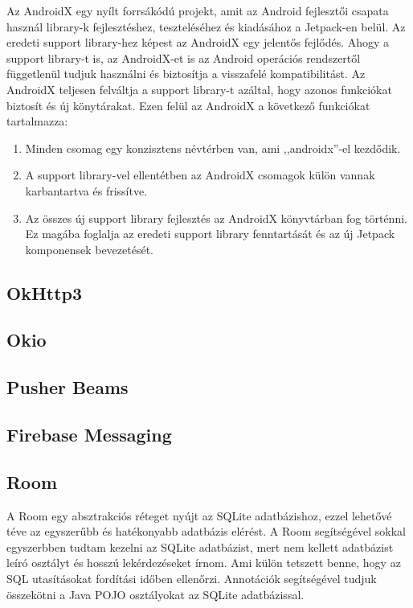 \documentclass{thesis-ekf}
\theoremstyle{definition}
\theoremstyle{remark}
\begin{document}
Az AndroidX egy nyílt forrsákódú projekt, amit az Android fejlesztői csapata használ library-k fejlesztéshez, teszteléséhez és kiadásához a Jetpack-en belül.
Az eredeti support library-hez képest az AndroidX egy jelentős fejlődés. Ahogy a support library-t is, az AndroidX-et is az Android operációs rendszertől függetlenül tudjuk használni és biztosítja a visszafelé kompatibilitást.
Az AndroidX teljesen felváltja a support library-t azáltal, hogy azonos funkciókat biztosít és új könytárakat.
Ezen felül az AndroidX a következő funkciókat tartalmazza:

\begin{enumerate}
	\item Minden csomag egy konzisztens névtérben van, ami ,,androidx''-el kezdődik.
	\item A support library-vel ellentétben az AndroidX csomagok külön vannak karbantartva és frissítve.
	\item Az összes új support library fejlesztés az AndroidX könyvtárban fog történni. Ez magába foglalja az eredeti support library fenntartását és az új Jetpack komponensek bevezetését.
\end{enumerate}



\subsection{OkHttp3}

\subsection{Okio}

\subsection{Pusher Beams}



\subsection{Firebase Messaging}

\subsection{Room}

A Room egy absztrakciós réteget nyújt az SQLite adatbázishoz, ezzel lehetővé téve az egyszerűbb és hatékonyabb adatbázis elérést.
A Room segítségével sokkal egyszerbben tudtam kezelni az SQLite adatbázist, mert nem kellett adatbázist leíró osztályt és hosszú lekérdezéseket írnom.
Ami külön tetszett benne, hogy az SQL utasításokat fordítási időben ellenőrzi.
Annotációk segítségével tudjuk összekötni a Java POJO osztályokat az SQLite adatbázissal.
\end{document}
